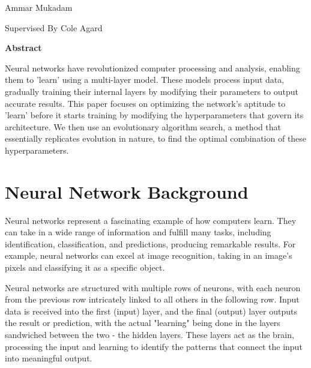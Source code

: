 \begin{center}
\vspace{4pt}
\large
    Ammar Mukadam
    
\small
    Supervised By Cole Agard

\end{center}



\begin{normalsize}
\begin{center}
\vspace{9pt}
\textbf{Abstract}    
\end{center}

\begin{adjustwidth}{2pt}{2pt}
\small \noindent Neural networks have revolutionized computer processing and analysis, enabling them to 'learn' using a multi-layer model. These models process input data, gradually training their internal layers by modifying their parameters to output accurate results. This paper focuses on optimizing the network's aptitude to 'learn' before it starts training by modifying the hyperparameters that govern its architecture. We then use an evolutionary algorithm search, a method that essentially replicates evolution in nature, to find the optimal combination of these hyperparameters.
\end{adjustwidth}


\end{normalsize}




\vspace{10pt}
\section{Neural Network Background}\label{Sec:Introduction}
Neural networks represent a fascinating example of how computers learn. They can take in a wide range of information and fulfill many tasks, including identification, classification, and predictions, producing remarkable results. For example, neural networks can excel at image recognition, taking in an image's pixels and classifying it as a specific object.

Neural networks are structured with multiple rows of neurons, with each neuron from the previous row intricately linked to all others in the following row. Input data is received into the first (input) layer, and the final (output) layer outputs the result or prediction, with the actual "learning" being done in the layers sandwiched between the two - the hidden layers. These layers act as the brain, processing the input and learning to identify the patterns that connect the input into meaningful output.


